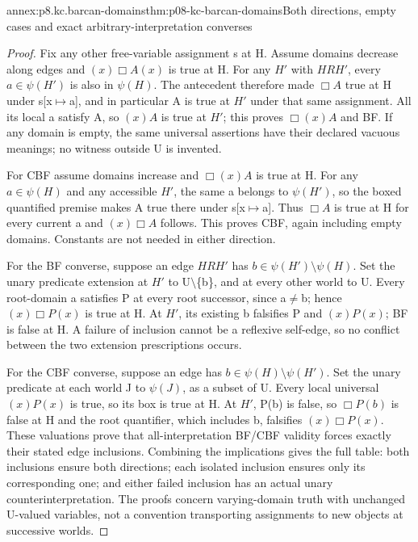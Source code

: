 \begin{annexitem}{annex:p8.kc.barcan-domains}{thm:p08-kc-barcan-domains}{Both directions, empty cases and exact arbitrary-interpretation converses}
\begin{proof}
Fix any other free-variable assignment s at H. Assume domains
decrease along edges and \((x)\Box A(x)\) is true at H.
For any \(H'\) with \(HRH'\), every
\(a\in\psi(H')\) is also in \(\psi(H)\). The antecedent
therefore made \(\Box A\) true at H under s[x\(\mapsto\)a],
and in particular A is true at \(H'\) under that same
assignment. All its local a satisfy A, so \((x)A\) is true
at \(H'\); this proves \(\Box(x)A\) and BF. If any
domain is empty, the same universal assertions have their
declared vacuous meanings; no witness outside U is invented.

For CBF assume domains increase and \(\Box(x)A\) is true
at H. For any \(a\in\psi(H)\) and any accessible \(H'\),
the same a belongs to \(\psi(H')\), so the boxed quantified
premise makes A true there under s[x\(\mapsto\)a]. Thus
\(\Box A\) is true at H for every current a and
\((x)\Box A\) follows. This proves CBF, again including
empty domains. Constants are not needed in either direction.

For the BF converse, suppose an edge \(HRH'\) has
\(b\in\psi(H')\setminus\psi(H)\). Set the unary
predicate extension at \(H'\) to U\(\setminus\)\{b\},
and at every other world to U. Every root-domain a satisfies
P at every root successor, since a\(\ne\)b; hence
\((x)\Box P(x)\) is true at H. At \(H'\), its existing
b falsifies P and \((x)P(x)\); BF is false at H. A failure
of inclusion cannot be a reflexive self-edge, so no conflict
between the two extension prescriptions occurs.

For the CBF converse, suppose an edge has
\(b\in\psi(H)\setminus\psi(H')\). Set the unary
predicate at each world J to \(\psi(J)\), as a subset of U.
Every local universal \((x)P(x)\) is true, so its box is
true at H. At \(H'\), P(b) is false, so \(\Box P(b)\)
is false at H and the root quantifier, which includes b,
falsifies \((x)\Box P(x)\). These valuations prove that
all-interpretation BF/CBF validity forces exactly their stated
edge inclusions. Combining the implications gives the full
table: both inclusions ensure both directions; each isolated
inclusion ensures only its corresponding one; and either
failed inclusion has an actual unary counterinterpretation.
The proofs concern varying-domain truth with unchanged
U-valued variables, not a convention transporting assignments
to new objects at successive worlds.
\end{proof}
\end{annexitem}

